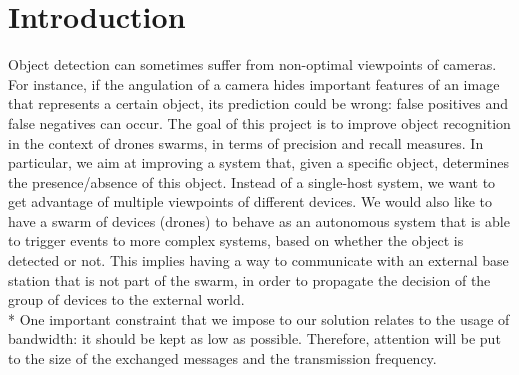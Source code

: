 \documentclass[10pt,conference,compsocconf]{IEEEtran}
\begin{document}
\section{Introduction}
Object detection can sometimes suffer from non-optimal viewpoints of cameras. For instance, if the angulation of a camera hides important features of an image that represents a certain object, its prediction could be wrong: false positives and false negatives can occur. The goal of this project is to improve object recognition in the context of drones swarms, in terms of precision and recall measures. In particular, we aim at improving a system that, given a specific object, determines the presence/absence of this object.
Instead of a single-host system, we want to get advantage of multiple viewpoints of different devices. We would also like to have a swarm of devices (drones) to behave as an autonomous system that is able to trigger events to more complex systems, based on whether the object is detected or not. This implies having a way to communicate with an external base station that is not part of the swarm, in order to propagate the decision of the group of devices to the external world.\\*
One important constraint that we impose to our solution relates to the usage of bandwidth: it should be kept as low as possible. Therefore, attention will be put to the size of the exchanged messages and the transmission frequency. %
\end{document}
